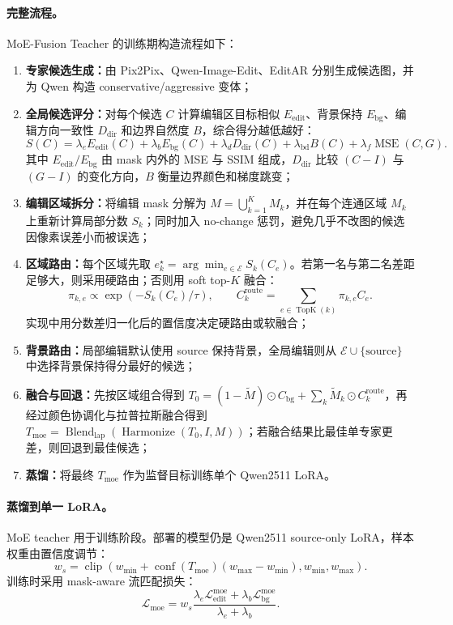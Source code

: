 \documentclass[UTF8,11pt,a4paper,fontset=fandol]{ctexart}
\begin{document}
\paragraph{完整流程。}
MoE-Fusion Teacher 的训练期构造流程如下：
\begin{enumerate}
  \item \textbf{专家候选生成：}由 Pix2Pix、Qwen-Image-Edit、EditAR 分别生成候选图，并为 Qwen 构造 conservative/aggressive 变体；
  \item \textbf{全局候选评分：}对每个候选 $C$ 计算编辑区目标相似 $E_{\mathrm{edit}}$、背景保持 $E_{\mathrm{bg}}$、编辑方向一致性 $D_{\mathrm{dir}}$ 和边界自然度 $B$，综合得分越低越好：
  \[
  S(C)=\lambda_e E_{\mathrm{edit}}(C)+\lambda_b E_{\mathrm{bg}}(C)
  +\lambda_d D_{\mathrm{dir}}(C)+\lambda_{\mathrm{bd}}B(C)
  +\lambda_f\operatorname{MSE}(C,G).
  \]
  其中 $E_{\mathrm{edit}}/E_{\mathrm{bg}}$ 由 mask 内外的 MSE 与 SSIM 组成，$D_{\mathrm{dir}}$ 比较 $(C-I)$ 与 $(G-I)$ 的变化方向，$B$ 衡量边界颜色和梯度跳变；
  \item \textbf{编辑区域拆分：}将编辑 mask 分解为 $M=\bigcup_{k=1}^{K}M_k$，并在每个连通区域 $M_k$ 上重新计算局部分数 $S_k$；同时加入 no-change 惩罚，避免几乎不改图的候选因像素误差小而被误选；
  \item \textbf{区域路由：}每个区域先取 $e_k^\star=\arg\min_{e\in\mathcal{E}}S_k(C_e)$。若第一名与第二名差距足够大，则采用硬路由；否则用 soft top-$K$ 融合：
  \[
  \pi_{k,e}\propto\exp(-S_k(C_e)/\tau),\qquad
  C_k^{\mathrm{route}}=\sum_{e\in\operatorname{TopK}(k)}\pi_{k,e}C_e.
  \]
  实现中用分数差归一化后的置信度决定硬路由或软融合；
  \item \textbf{背景路由：}局部编辑默认使用 source 保持背景，全局编辑则从 $\mathcal{E}\cup\{\text{source}\}$ 中选择背景保持得分最好的候选；
  \item \textbf{融合与回退：}先按区域组合得到 $T_0=(1-\tilde M)\odot C_{\mathrm{bg}}+\sum_k\tilde M_k\odot C_k^{\mathrm{route}}$，再经过颜色协调化与拉普拉斯融合得到 $T_{\mathrm{moe}}=\operatorname{Blend}_{\mathrm{lap}}(\operatorname{Harmonize}(T_0,I,M))$；若融合结果比最佳单专家更差，则回退到最佳候选；
  \item \textbf{蒸馏：}将最终 $T_{\mathrm{moe}}$ 作为监督目标训练单个 Qwen2511 LoRA。
\end{enumerate}

\paragraph{蒸馏到单一 LoRA。}
MoE teacher 用于训练阶段。部署的模型仍是 Qwen2511 source-only LoRA，样本权重由置信度调节：
\[
w_s=\operatorname{clip}(w_{\min}+\operatorname{conf}(T_{\mathrm{moe}})(w_{\max}-w_{\min}),w_{\min},w_{\max}).
\]
训练时采用 mask-aware 流匹配损失：
\[
\mathcal{L}_{\mathrm{moe}}=w_s
\frac{\lambda_e\mathcal{L}_{\mathrm{edit}}^{\mathrm{moe}}
+\lambda_b\mathcal{L}_{\mathrm{bg}}^{\mathrm{moe}}}
{\lambda_e+\lambda_b}.
\]
\end{document}
